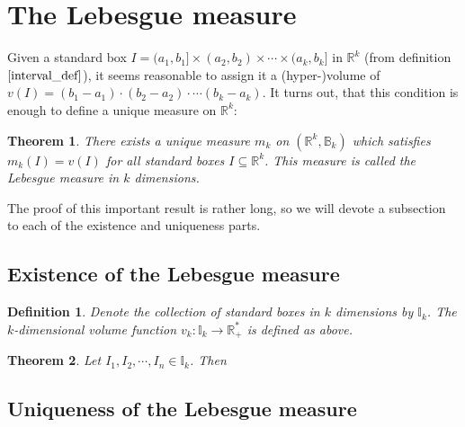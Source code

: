 \documentclass[12pt, a4paper]{article}
\newtheorem{theorem}{Theorem}[section]
\newtheorem{definition}{Definition}[section]
\numberwithin{equation}{section}
\begin{document}
\section{The Lebesgue measure}
Given a standard box $I=(a_1,b_1]\times(a_2,b_2)\times\cdots\times(a_k,b_k]$ in $\mathbb{R}^k$ (from definition $\ref{interval_def}$), it seems reasonable to assign it a (hyper-)volume of $v(I)=(b_1-a_1)\cdot(b_2-a_2)\cdot\cdots(b_k-a_k)$. It turns out, that this condition is enough to define a unique measure on $\mathbb{R}^k$:

\begin{theorem}
There exists a unique measure $m_k$ on $(\mathbb{R}^k,\mathbb{B}_k)$ which satisfies $m_k(I)=v(I)$ for all standard boxes $I\subseteq\mathbb{R}^k$. This measure is called the Lebesgue measure in $k$ dimensions.
\end{theorem}

The proof of this important result is rather long, so we will devote a subsection to each of the existence and uniqueness parts.

\subsection{Existence of the Lebesgue measure}
\begin{definition}
Denote the collection of standard boxes in $k$ dimensions by $\mathbb{I}_k$. The $k$-dimensional volume function $v_k: \mathbb{I}_k\rightarrow\mathbb{R}^*_+$ is defined as above.
\end{definition}

\begin{theorem}
Let $I_1, I_2,\cdots, I_n\in\mathbb{I}_k$. Then 
\end{theorem}


\subsection{Uniqueness of the Lebesgue measure}
\end{document}
